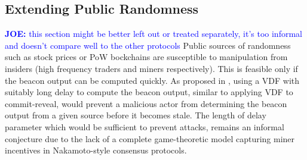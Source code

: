 \documentclass[letterpaper,twocolumn,10pt]{article}
\theoremstyle{definition}
\theoremstyle{remark}
\newcommand{\joenote}[1]{\textcolor{blue}{\textbf{JOE:} #1}}
\begin{document}
\subsection{Extending Public Randomness}
\joenote{this section might be better left out or treated separately, it's too informal and doesn't compare well to the other protocols}
Public sources of randomness such as stock prices or PoW bockchains are susceptible to manipulation from insiders (high frequency traders and miners respectively). This is feasible only if the beacon output can be computed quickly. As proposed in \cite{bunz2017proofs}, using a VDF with suitably long delay to compute the beacon output, similar to applying VDF to commit-reveal, would prevent a malicious actor from determining the beacon output from a given source before it becomes stale. The length of delay parameter which would be sufficient to prevent attacks, remains an informal conjecture due to the lack of a complete game-theoretic model capturing miner incentives in Nakamoto-style consensus protocols.
\end{document}

